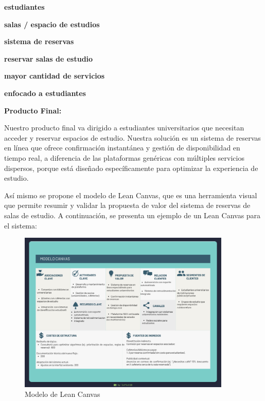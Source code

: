 \documentclass{article}
\begin{document}
      \begin{description}[leftmargin=2cm,style=nextline]
        \item[Para] \textbf{estudiantes}
        \item[que necesitan] \textbf{salas / espacio de estudios}
        \item[nuestra solución es] \textbf{sistema de reservas}
        \item[que ofrece] \textbf{reservar salas de estudio}
        \item[a diferencia de] \textbf{mayor cantidad de servicios}
        \item[porque] \textbf{enfocado a estudiantes}
      \end{description}

      \newpage
      
      \noindent\textbf{Producto Final:}
      
      Nuestro producto final va dirigido a estudiantes universitarios que necesitan acceder y reservar espacios de estudio. Nuestra solución es un sistema de reservas en línea que ofrece confirmación instantánea y gestión de disponibilidad en tiempo real, a diferencia de las plataformas genéricas con múltiples servicios dispersos, porque está diseñado específicamente para optimizar la experiencia de estudio.

      Así mismo se propone el modelo de Lean Canvas, que es una herramienta visual que permite resumir y validar la propuesta de valor del sistema de reservas de salas de estudio. A continuación, se presenta un ejemplo de un Lean Canvas para el sistema:

      \begin{figure}[ht]
        \centering
        \includegraphics[width=0.9\textwidth]{assets/lean.png}
        \caption{Modelo de Lean Canvas}
        \label{fig:example-image}
      \end{figure}
\end{document}
